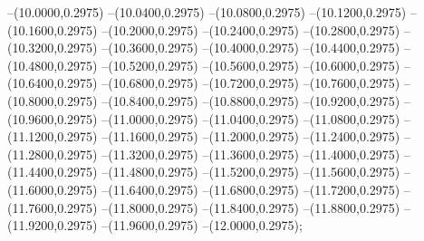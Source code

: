 {	--(10.0000,0.2975)
	--(10.0400,0.2975)
	--(10.0800,0.2975)
	--(10.1200,0.2975)
	--(10.1600,0.2975)
	--(10.2000,0.2975)
	--(10.2400,0.2975)
	--(10.2800,0.2975)
	--(10.3200,0.2975)
	--(10.3600,0.2975)
	--(10.4000,0.2975)
	--(10.4400,0.2975)
	--(10.4800,0.2975)
	--(10.5200,0.2975)
	--(10.5600,0.2975)
	--(10.6000,0.2975)
	--(10.6400,0.2975)
	--(10.6800,0.2975)
	--(10.7200,0.2975)
	--(10.7600,0.2975)
	--(10.8000,0.2975)
	--(10.8400,0.2975)
	--(10.8800,0.2975)
	--(10.9200,0.2975)
	--(10.9600,0.2975)
	--(11.0000,0.2975)
	--(11.0400,0.2975)
	--(11.0800,0.2975)
	--(11.1200,0.2975)
	--(11.1600,0.2975)
	--(11.2000,0.2975)
	--(11.2400,0.2975)
	--(11.2800,0.2975)
	--(11.3200,0.2975)
	--(11.3600,0.2975)
	--(11.4000,0.2975)
	--(11.4400,0.2975)
	--(11.4800,0.2975)
	--(11.5200,0.2975)
	--(11.5600,0.2975)
	--(11.6000,0.2975)
	--(11.6400,0.2975)
	--(11.6800,0.2975)
	--(11.7200,0.2975)
	--(11.7600,0.2975)
	--(11.8000,0.2975)
	--(11.8400,0.2975)
	--(11.8800,0.2975)
	--(11.9200,0.2975)
	--(11.9600,0.2975)
	--(12.0000,0.2975);
}
